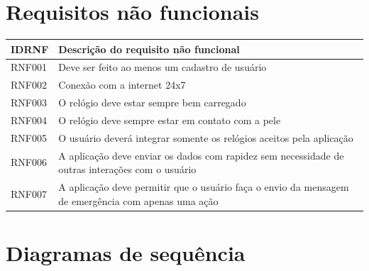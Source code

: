 \documentclass[
	12pt,				%
	openright,			%
	oneside,			%
	a4paper,			%
	english,			%
	french,				%
	spanish,			%
	brazil				%
]{abntex2}
\begin{document}
\chapter{Requisitos não funcionais}
\begin{center}
\begin{tabular}{ |p{7cm}|p{7cm}| }
 \hline
 \textbf{IDRNF} & \textbf{Descrição do requisito não funcional} \\ [0.5ex]
 \hline
 RNF001 & Deve ser feito ao menos um cadastro de usuário \\
 \hline
 RNF002 & Conexão com a internet 24x7 \\
 \hline
 RNF003 & O relógio deve estar sempre bem carregado \\
 \hline
 RNF004 & O relógio deve sempre estar em contato com a pele \\
 \hline
 RNF005 & O usuário deverá integrar somente os relógios aceitos pela aplicação \\
 \hline
 RNF006 & A aplicação deve enviar os dados com rapidez sem necessidade de outras interações
  com o usuário \\
  \hline
 RNF007 & A aplicação deve permitir que o usuário faça o envio da mensagem de emergência com apenas uma ação \\
 \hline
\end{tabular}
\end{center}

\chapter{Diagramas de sequência}
%
\end{document}
